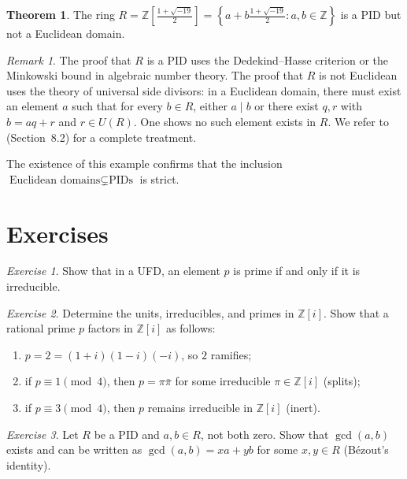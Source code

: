 \documentclass[12pt,a4paper,openany]{book}
\theoremstyle{definition}
\newtheorem{theorem}{Theorem}[chapter]
\theoremstyle{remark}
\newtheorem{remark}{Remark}[chapter]
\newtheorem{exercise}{Exercise}[chapter]
\renewcommand{\gcd}{\operatorname{gcd}}
\begin{document}
\begin{theorem}\label{thm:PID-not-euclidean}
The ring $R=\mathbb{Z}\!\left[\frac{1+\sqrt{-19}}{2}\right]=\left\{a+b\frac{1+\sqrt{-19}}{2} : a,b\in\mathbb{Z}\right\}$ is a PID but not a Euclidean domain.
\end{theorem}

\begin{remark}\label{rem:PID-not-euclidean-detail}
The proof that $R$ is a PID uses the Dedekind--Hasse criterion or the Minkowski bound in algebraic number theory. The proof that $R$ is not Euclidean uses the theory of universal side divisors: in a Euclidean domain, there must exist an element $a$ such that for every $b\in R$, either $a\mid b$ or there exist $q,r$ with $b=aq+r$ and $r\in U(R)$. One shows no such element exists in $R$. We refer to \cite{dummit-foote} (Section~8.2) for a complete treatment.
\end{remark}

The existence of this example confirms that the inclusion $\text{Euclidean domains}\subsetneq\text{PIDs}$ is strict.

\section{Exercises}\label{sec:pid-exercises}

\begin{exercise}\label{exo:pid-1}
Show that in a UFD, an element $p$ is prime if and only if it is irreducible.
\end{exercise}

\begin{exercise}\label{exo:pid-2}
Determine the units, irreducibles, and primes in $\mathbb{Z}[i]$. Show that a rational prime $p$ factors in $\mathbb{Z}[i]$ as follows:
\begin{enumerate}[label=(\alph*)]
    \item $p=2=(1+i)(1-i)(-i)$, so $2$ ramifies;
    \item if $p\equiv 1\pmod{4}$, then $p=\pi\bar{\pi}$ for some irreducible $\pi\in\mathbb{Z}[i]$ (splits);
    \item if $p\equiv 3\pmod{4}$, then $p$ remains irreducible in $\mathbb{Z}[i]$ (inert).
\end{enumerate}
\end{exercise}

\begin{exercise}\label{exo:pid-3}
Let $R$ be a PID and $a,b\in R$, not both zero. Show that $\gcd(a,b)$ exists and can be written as $\gcd(a,b)=xa+yb$ for some $x,y\in R$ (B\'ezout's identity).
\end{exercise}
\end{document}
